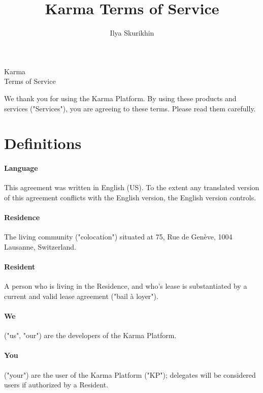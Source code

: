 \documentclass[12pt,a4paper]{article}
\author{Ilya Skurikhin}
\title{Karma Terms of Service}
\begin{document}
\begin{center}
{\Huge Karma \\ \vspace{5mm} Terms of Service} \\
\end{center}

\vspace{5mm}

We thank you for using the Karma Platform. By using these products and services ("Services"), you are agreeing to these terms. Please read them carefully.

\section{Definitions}

\paragraph{Language}

This agreement was written in English (US). To the extent any translated version of this agreement conflicts with the English version, the English version controls.

\paragraph{Residence}

The living community ("colocation") situated at 75, Rue de Genève, 1004 Lausanne, Switzerland.

\paragraph{Resident}

A person who is living in the Residence, and who's lease is substantiated by a current and valid lease agreement ("bail à loyer").

\paragraph{We}

("us", "our") are the developers of the Karma Platform. 

\paragraph{You}

("your") are the user of the Karma Platform ("KP"); delegates will be considered users if authorized by a Resident.
	
\end{document}
